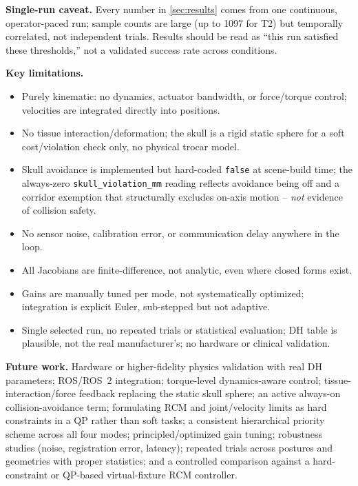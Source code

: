 \documentclass[11pt,a4paper]{article}
\newcommand{\code}[1]{\texttt{#1}}
\begin{document}
\textbf{Single-run caveat.} Every number in \cref{sec:results} comes from one continuous, operator-paced run; sample counts are large (up to 1097 for T2) but temporally correlated, not independent trials. Results should be read as ``this run satisfied these thresholds,'' not a validated success rate across conditions.

\textbf{Key limitations.}
\begin{itemize}[leftmargin=14pt]
\item Purely kinematic: no dynamics, actuator bandwidth, or force/torque control; velocities are integrated directly into positions.
\item No tissue interaction/deformation; the skull is a rigid static sphere for a soft cost/violation check only, no physical trocar model.
\item Skull avoidance is implemented but hard-coded \code{false} at scene-build time; the always-zero \code{skull\_violation\_mm} reading reflects avoidance being off and a corridor exemption that structurally excludes on-axis motion -- \emph{not} evidence of collision safety.
\item No sensor noise, calibration error, or communication delay anywhere in the loop.
\item All Jacobians are finite-difference, not analytic, even where closed forms exist.
\item Gains are manually tuned per mode, not systematically optimized; integration is explicit Euler, sub-stepped but not adaptive.
\item Single selected run, no repeated trials or statistical evaluation; DH table is plausible, not the real manufacturer's; no hardware or clinical validation.
\end{itemize}

\textbf{Future work.} Hardware or higher-fidelity physics validation with real DH parameters; ROS/ROS~2 integration; torque-level dynamics-aware control; tissue-interaction/force feedback replacing the static skull sphere; an active always-on collision-avoidance term; formulating RCM and joint/velocity limits as hard constraints in a QP rather than soft tasks; a consistent hierarchical priority scheme across all four modes; principled/optimized gain tuning; robustness studies (noise, registration error, latency); repeated trials across postures and geometries with proper statistics; and a controlled comparison against a hard-constraint or QP-based virtual-fixture RCM controller.

\end{document}
